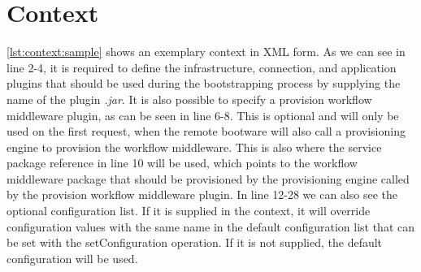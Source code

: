 \section{Context}
\label{implementation:context}

\vspace*{\baselineskip}

\autoref{lst:context:sample} shows an exemplary context in XML form.
As we can see in line 2-4, it is required to define the infrastructure, connection, and application plugins that should be used during the bootstrapping process by supplying the name of the plugin \textit{.jar}.
It is also possible to specify a provision workflow middleware plugin, as can be seen in line 6-8.
This is optional and will only be used on the first request, when the remote bootware will also call a provisioning engine to provision the workflow middleware.
This is also where the service package reference in line 10 will be used, which points to the workflow middleware package that should be provisioned by the provisioning engine called by the provision workflow middleware plugin.
In line 12-28 we can also see the optional configuration list.
If it is supplied in the context, it will override configuration values with the same name in the default configuration list that can be set with the setConfiguration operation.
If it is not supplied, the default configuration will be used.
